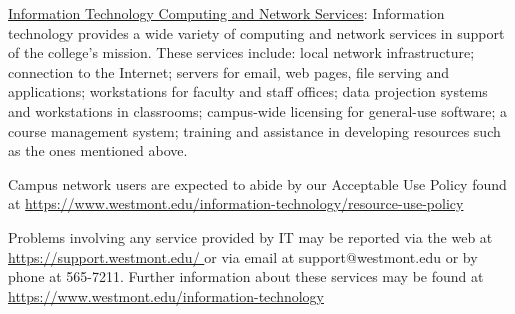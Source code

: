 		\underline{Information Technology Computing and Network Services}:  Information technology provides a wide variety of computing and network services in support of the college's mission.  These services include:  local network infrastructure; connection to the Internet; servers for email, web pages, file serving and applications; workstations for faculty and staff offices; data projection systems and workstations in classrooms; campus-wide licensing for general-use software; a course management system; training and assistance in developing resources such as the ones mentioned above.

		Campus network users are expected to abide by our Acceptable Use Policy found at
		\href{
			https://www.westmont.edu/information-technology/resource-use-policy
		}{\url{
				https://www.westmont.edu/information-technology/resource-use-policy
			}}

		Problems involving any service provided by IT may be reported via the web at
		\href{
			https://support.westmont.edu/
		}{\url{
				https://support.westmont.edu/
			}}
		or via email at support@westmont.edu
		or by phone at 565-7211.  Further information about these services may be found at
		\href{
			https://www.westmont.edu/information-technology
		}{\url{
				https://www.westmont.edu/information-technology
			}}
